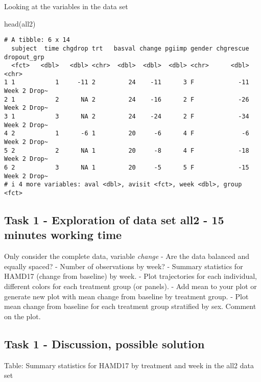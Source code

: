\documentclass[
  letterpaper,
  DIV=11,
  numbers=noendperiod]{scrreprt}
\newenvironment{Shaded}{\begin{snugshade}}{\end{snugshade}}
\newcommand{\FunctionTok}[1]{\textcolor[rgb]{0.28,0.35,0.67}{#1}}
\newcommand{\NormalTok}[1]{\textcolor[rgb]{0.00,0.23,0.31}{#1}}
\begin{document}
Looking at the variables in the data set

\begin{Shaded}
\begin{Highlighting}[]
\FunctionTok{head}\NormalTok{(all2)}
\end{Highlighting}
\end{Shaded}

\begin{verbatim}
# A tibble: 6 x 14
  subject  time chgdrop trt   basval change pgiimp gender chgrescue dropout_grp 
  <fct>   <dbl>   <dbl> <chr>  <dbl>  <dbl>  <dbl> <chr>      <dbl> <chr>       
1 1           1     -11 2         24    -11      3 F            -11 Week 2 Drop~
2 1           2      NA 2         24    -16      2 F            -26 Week 2 Drop~
3 1           3      NA 2         24    -24      2 F            -34 Week 2 Drop~
4 2           1      -6 1         20     -6      4 F             -6 Week 2 Drop~
5 2           2      NA 1         20     -8      4 F            -18 Week 2 Drop~
6 2           3      NA 1         20     -5      5 F            -15 Week 2 Drop~
# i 4 more variables: aval <dbl>, avisit <fct>, week <dbl>, group <fct>
\end{verbatim}

\hypertarget{task-1---exploration-of-data-set-all2---15-minutes-working-time}{%
\subsection{Task 1 - Exploration of data set all2 - 15 minutes working
time}\label{task-1---exploration-of-data-set-all2---15-minutes-working-time}}

Only consider the complete data, variable \emph{change} - Are the data
balanced and equally spaced? - Number of observations by week? - Summary
statistics for HAMD17 (change from baseline) by week. - Plot
trajectories for each individual, different colors for each treatment
group (or panels). - Add mean to your plot or generate new plot with
mean change from baseline by treatment group. - Plot mean change from
baseline for each treatment group stratified by sex. Comment on the
plot.

\hypertarget{task-1---discussion-possible-solution}{%
\subsection{Task 1 - Discussion, possible
solution}\label{task-1---discussion-possible-solution}}

Table: Summary statistics for HAMD17 by treatment and week in the all2
data set
\end{document}
